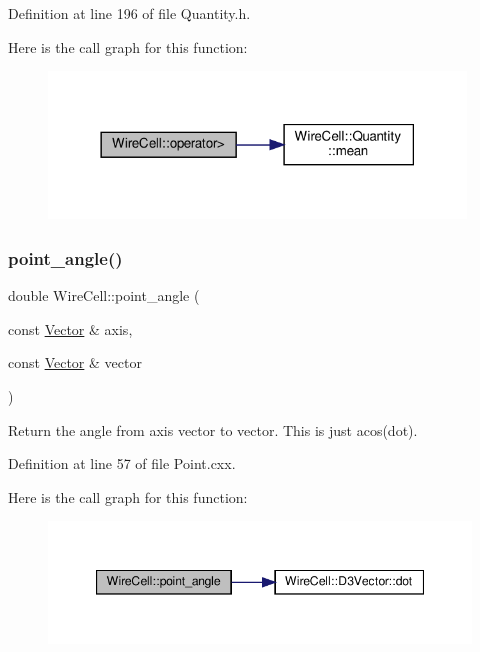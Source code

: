Definition at line 196 of file Quantity.\+h.

Here is the call graph for this function\+:
\nopagebreak
\begin{figure}[H]
\begin{center}
\leavevmode
\includegraphics[width=314pt]{namespace_wire_cell_a58f770141d858d0d03024cfafadc2f6a_cgraph}
\end{center}
\end{figure}
\mbox{\label{namespace_wire_cell_a6686e72c77f10942558aacbe3383a0f0}} 
\subsubsection{\texorpdfstring{point\+\_\+angle()}{point\_angle()}}
{\footnotesize\ttfamily double Wire\+Cell\+::point\+\_\+angle (\begin{DoxyParamCaption}\item[{const \hyperlink{namespace_wire_cell_aa3c82d3ba85f032b0d278b7004846800}{Vector} \&}]{axis,  }\item[{const \hyperlink{namespace_wire_cell_aa3c82d3ba85f032b0d278b7004846800}{Vector} \&}]{vector }\end{DoxyParamCaption})}

Return the angle from axis vector to vector. This is just acos(dot). 

Definition at line 57 of file Point.\+cxx.

Here is the call graph for this function\+:
\nopagebreak
\begin{figure}[H]
\begin{center}
\leavevmode
\includegraphics[width=347pt]{namespace_wire_cell_a6686e72c77f10942558aacbe3383a0f0_cgraph}
\end{center}
\end{figure}
\mbox{\label{namespace_wire_cell_a1f164ff69a3d3df581b27e68d63236b3}} 
